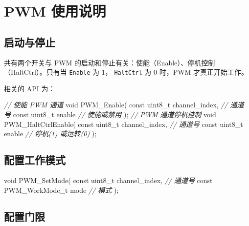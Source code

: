 \documentclass[
  12pt,
]{book}
\newenvironment{Shaded}{\begin{snugshade}}{\end{snugshade}}
\newcommand{\CommentTok}[1]{\textcolor[rgb]{0.56,0.35,0.01}{\textit{#1}}}
\newcommand{\DataTypeTok}[1]{\textcolor[rgb]{0.13,0.29,0.53}{#1}}
\newcommand{\NormalTok}[1]{#1}
\begin{document}
\hypertarget{pwm-ux4f7fux7528ux8bf4ux660e}{%
\section{PWM 使用说明}\label{pwm-ux4f7fux7528ux8bf4ux660e}}

\hypertarget{ux542fux52a8ux4e0eux505cux6b62}{%
\subsection{启动与停止}\label{ux542fux52a8ux4e0eux505cux6b62}}

共有两个开关与 PWM 的启动和停止有关：使能（Enable）、停机控制（HaltCtrl）。只有当 \texttt{Enable} 为 1，
\texttt{HaltCtrl} 为 0 时，PWM 才真正开始工作。

相关的 API 为：

\begin{Shaded}
\begin{Highlighting}[]
\CommentTok{// 使能 PWM 通道}
\DataTypeTok{void}\NormalTok{ PWM_Enable(}
    \DataTypeTok{const} \DataTypeTok{uint8_t}\NormalTok{ channel_index,    }\CommentTok{// 通道号}
    \DataTypeTok{const} \DataTypeTok{uint8_t}\NormalTok{ enable            }\CommentTok{// 使能或禁用}
\NormalTok{    );}
\CommentTok{// PWM 通道停机控制}
\DataTypeTok{void}\NormalTok{ PWM_HaltCtrlEnable(}
    \DataTypeTok{const} \DataTypeTok{uint8_t}\NormalTok{ channel_index,    }\CommentTok{// 通道号}
    \DataTypeTok{const} \DataTypeTok{uint8_t}\NormalTok{ enable            }\CommentTok{// 停机(1) 或运转(0)}
\NormalTok{    );}
\end{Highlighting}
\end{Shaded}

\hypertarget{ux914dux7f6eux5de5ux4f5cux6a21ux5f0f}{%
\subsection{配置工作模式}\label{ux914dux7f6eux5de5ux4f5cux6a21ux5f0f}}

\begin{Shaded}
\begin{Highlighting}[]
\DataTypeTok{void}\NormalTok{ PWM_SetMode(}
    \DataTypeTok{const} \DataTypeTok{uint8_t}\NormalTok{ channel_index,    }\CommentTok{// 通道号}
    \DataTypeTok{const}\NormalTok{ PWM_WorkMode_t mode       }\CommentTok{// 模式}
\NormalTok{    );}
\end{Highlighting}
\end{Shaded}

\hypertarget{ux914dux7f6eux95e8ux9650}{%
\subsection{配置门限}\label{ux914dux7f6eux95e8ux9650}}
\end{document}
